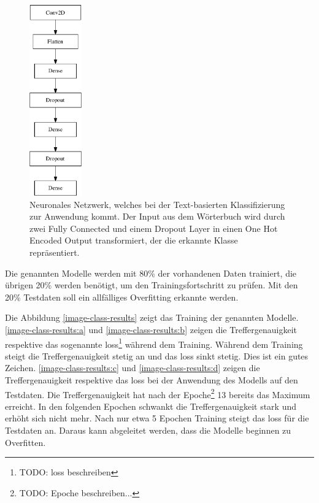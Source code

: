 \begin{figure} 
    \caption{Neuronales Netzwerk, welches bei der Text-basierten Klassifizierung zur Anwendung kommt. Der Input aus dem Wörterbuch wird durch zwei Fully Connected und einem Dropout Layer in einen One Hot Encoded Output transformiert, der die erkannte Klasse repräsentiert.}
    \label{image-classification-model}
    \centering
    \includegraphics[width=0.2\textwidth]{graphics/image-classification-results/model.pdf}
\end{figure}

Die genannten Modelle werden mit 80\% der vorhandenen Daten trainiert, die übrigen 20\% werden benötigt, um den Trainingsfortschritt zu prüfen. Mit den 20\% Testdaten soll ein allfälliges Overfitting erkannte werden.

Die Abbildung \ref{image-class-results} zeigt das Training der genannten Modelle. \ref{image-class-results:a} und \ref{image-class-results:b} zeigen die Treffergenauigkeit respektive das sogenannte loss\footnote{TODO: loss beschreiben} während dem Training. Während dem Training steigt die Treffergenauigkeit stetig an und das loss sinkt stetig. Dies ist ein gutes Zeichen. \ref{image-class-results:c} und \ref{image-class-results:d} zeigen die Treffergenauigkeit respektive das loss bei der Anwendung des Modells auf den Testdaten. Die Treffergenauigkeit hat nach der Epoche\footnote{TODO: Epoche beschreiben...} 13 bereits das Maximum erreicht. In den folgenden Epochen schwankt die Treffergenauigkeit stark und erhöht sich nicht mehr. Nach nur etwa 5 Epochen Training steigt das loss für die Testdaten an. Daraus kann abgeleitet werden, dass die Modelle beginnen zu Overfitten.

